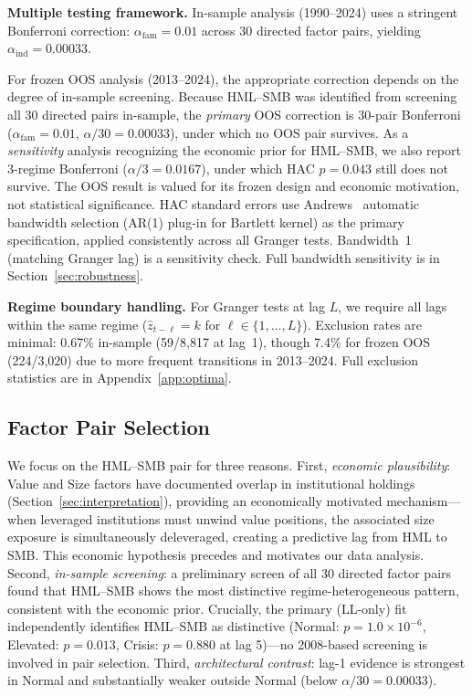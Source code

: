 \documentclass[sigconf,anonymous]{acmart}
\begin{document}
\textbf{Multiple testing framework.}
In-sample analysis (1990--2024) uses a stringent Bonferroni correction:
$\alpha_{\text{fam}} = 0.01$ across 30 directed factor pairs, yielding
$\alpha_{\text{ind}} = 0.00033$. 

For frozen OOS analysis (2013--2024), the appropriate correction depends on the
degree of in-sample screening. Because HML--SMB was identified from screening
all 30 directed pairs in-sample, the \emph{primary} OOS correction is
30-pair Bonferroni ($\alpha_{\text{fam}} = 0.01$, $\alpha/30 = 0.00033$), under
which no OOS pair survives. As a \emph{sensitivity} analysis recognizing
the economic prior for HML--SMB, we also report 3-regime Bonferroni
($\alpha/3 = 0.0167$), under which HAC $p = 0.043$ still does not survive.
The OOS result is valued for its frozen
design and economic motivation, not statistical significance.
HAC standard errors use Andrews~\cite{andrews1991heteroskedasticity}
automatic bandwidth selection (AR(1) plug-in for Bartlett kernel) as the primary specification,
applied consistently across all Granger tests. Bandwidth~1 (matching Granger lag) is a sensitivity check. Full bandwidth sensitivity is in
Section~\ref{sec:robustness}.

\textbf{Regime boundary handling.} For Granger tests at lag $L$,
we require all lags within the same regime ($\hat{z}_{t-\ell} = k$ for
$\ell \in \{1, \ldots, L\}$). Exclusion rates are minimal: 0.67\%
in-sample (59/8{,}817 at lag~1), though 7.4\% for frozen OOS (224/3{,}020)
due to more frequent transitions in 2013--2024. Full exclusion statistics
are in Appendix~\ref{app:optima}.

\subsection{Factor Pair Selection}
\label{sec:pairselection}

We focus on the HML--SMB pair for three reasons. First, \emph{economic
plausibility}: Value and Size factors have documented overlap in institutional
holdings (Section~\ref{sec:interpretation}), providing an economically motivated
mechanism---when leveraged institutions must unwind value positions, the associated
size exposure is simultaneously deleveraged, creating a predictive lag from HML
to SMB. This economic hypothesis precedes and motivates our data analysis.
Second, \emph{in-sample screening}: a preliminary screen of all 30 directed
factor pairs found that HML--SMB shows the most distinctive regime-heterogeneous
pattern, consistent with the economic prior. Crucially, the primary (LL-only) fit
independently identifies HML--SMB as distinctive (Normal: $p = 1.0 \times 10^{-6}$,
Elevated: $p = 0.013$, Crisis: $p = 0.880$ at lag 5)---no 2008-based screening is
involved in pair selection.
Third, \emph{architectural contrast}: lag-1 evidence is strongest in Normal and
substantially weaker outside Normal (below $\alpha/30 = 0.00033$).
\end{document}
